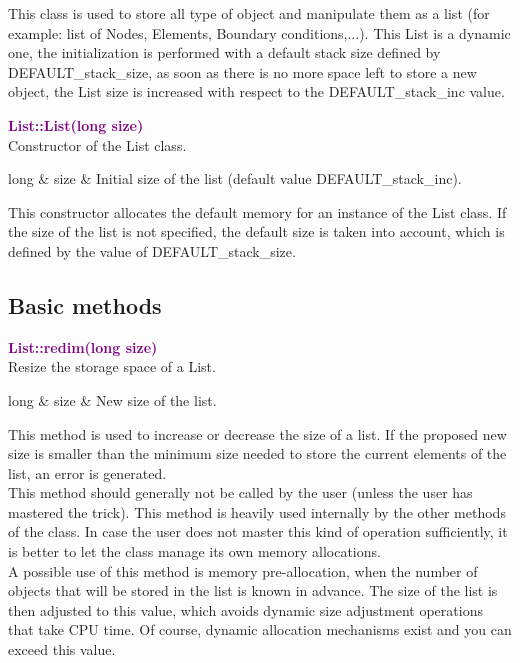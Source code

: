 This class is used to store all type of object and manipulate them as a list (for example: list of Nodes, Elements, Boundary conditions,...).
This List is a dynamic one, the initialization is performed with a default stack size defined by DEFAULT\_stack\_size, as soon as there is no more space left to store a new object,
the List size is increased with respect to the DEFAULT\_stack\_inc value.



\textcolor{purple}{\textbf{List::List(long size)}}\label{List::List(long size)}\\
Constructor of the List class.

\begin{tcolorbox}[width=\textwidth,myArgs,tabularx={ll|R}]
long & size & Initial size of the list (default value DEFAULT\_stack\_inc).
\end{tcolorbox}

This constructor allocates the default memory for an instance of the List class.
If the size of the list is not specified, the default size is taken into account, which is defined by the value of DEFAULT\_stack\_size.

\subsection{Basic methods}

\textcolor{purple}{\textbf{List::redim(long size)}}\label{List::redim(long size)}\\
Resize the storage space of a List.

\begin{tcolorbox}[width=\textwidth,myArgs,tabularx={ll|R}]
long & size & New size of the list.
\end{tcolorbox}

This method is used to increase or decrease the size of a list.
If the proposed new size is smaller than the minimum size needed to store the current elements of the list, an error is generated.\\
This method should generally not be called by the user (unless the user has mastered the trick).
This method is heavily used internally by the other methods of the class.
In case the user does not master this kind of operation sufficiently, it is better to let the class manage its own memory allocations.\\
A possible use of this method is memory pre-allocation, when the number of objects that will be stored in the list is known in advance.
The size of the list is then adjusted to this value, which avoids dynamic size adjustment operations that take CPU time.
Of course, dynamic allocation mechanisms exist and you can exceed this value.

